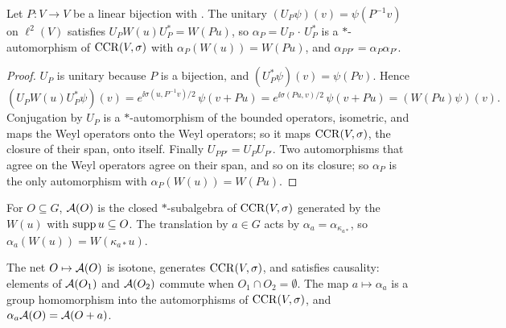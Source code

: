 \noindent{}

\begin{lemma}[Relabelling]\label{lem:relabel}
Let $P\colon V\to V$ be a linear bijection with . The unitary
$(U_P\psi)(v)=\psi(P^{-1}v)$ on $\ell^2(V)$ satisfies $U_PW(u)U_P^*=W(Pu)$, so $\alpha_P=U_P\,\cdot\,U_P^*$ is a
$*$-automorphism of $\operatorname{CCR}(V,\sigma)$ with $\alpha_P(W(u))=W(Pu)$, and $\alpha_{PP'}=\alpha_P\alpha_{P'}$.
\end{lemma}

\begin{proof}
$U_P$ is unitary because $P$ is a bijection, and $(U_P^*\psi)(v)=\psi(Pv)$. Hence
\[(U_PW(u)U_P^*\psi)(v)=e^{\ii\sigma(u,P^{-1}v)/2}\,\psi(v+Pu)=e^{\ii\sigma(Pu,v)/2}\,\psi(v+Pu)=(W(Pu)\psi)(v).\]
Conjugation by $U_P$ is a $*$-automorphism of the bounded operators, isometric, and maps the Weyl
operators onto the Weyl operators; so it maps $\operatorname{CCR}(V,\sigma)$, the closure of their span, onto
itself. Finally $U_{PP'}=U_PU_{P'}$. Two automorphisms that agree on the Weyl operators agree on
their span, and so on its closure; so $\alpha_P$ is the only automorphism with
$\alpha_P(W(u))=W(Pu)$.
\end{proof}

\begin{definition}\label{def:ccr-net}
For $O\subseteq G$, $\mathcal A(O)$ is the closed $*$-subalgebra of $\operatorname{CCR}(V,\sigma)$ generated by the $W(u)$
with $\operatorname{supp} u\subseteq O$. The translation by $a\in G$ acts by $\alpha_a=\alpha_{\kappa_{a*}}$, so
$\alpha_a(W(u))=W(\kappa_{a*}u)$.
\end{definition}

\begin{theorem}\label{thm:ccr-net}
The net $O\mapsto\mathcal A(O)$ is isotone, generates $\operatorname{CCR}(V,\sigma)$, and satisfies causality: elements of
$\mathcal A(O_1)$ and $\mathcal A(O_2)$ commute when $O_1\cap O_2=\emptyset$. The map $a\mapsto\alpha_a$ is a group
homomorphism into the automorphisms of $\operatorname{CCR}(V,\sigma)$, and $\alpha_a\mathcal A(O)=\mathcal A(O+a)$.
\end{theorem}


